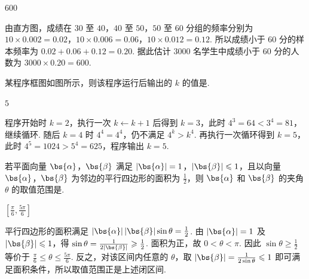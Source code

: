 \begin{answer}
\(600\)
\end{answer}

\begin{solution}
由直方图，成绩在 \(30\) 至 \(40\)，\(40\) 至 \(50\)，\(50\) 至 \(60\) 分组的频率分别为 \(10\times0.002=0.02\)，\(10\times0.006=0.06\)，\(10\times0.012=0.12\). 所以成绩小于 \(60\) 分的样本频率为 \(0.02+0.06+0.12=0.20\). 据此估计 \(3000\) 名学生中成绩小于 \(60\) 分的人数为 \(3000\times0.20=600\).
\end{solution}

\begin{problem}
某程序框图如图所示，则该程序运行后输出的 \(k\) 的值是\fillinblank{}.
\end{problem}

\begin{answer}
\(5\)
\end{answer}

\begin{solution}
程序开始时 \(k=2\)，执行一次 \(k\leftarrow k+1\) 后得到 \(k=3\)，此时 \(4^3=64<3^4=81\)，继续循环. 随后 \(k=4\) 时 \(4^4=4^4\)，仍不满足 \(4^k>k^4\). 再执行一次循环得到 \(k=5\)，此时 \(4^5=1024>5^4=625\)，程序输出 \(k=5\).
\end{solution}

\begin{problem}
若平面向量 \(\bs{\alpha}\)，\(\bs{\beta}\) 满足 \(|\bs{\alpha}| = 1\)，\(|\bs{\beta}| \leqslant 1\)，且以向量 \(\bs{\alpha}\)，\(\bs{\beta}\) 为邻边的平行四边形的面积为 \(\frac{1}{2}\)，则 \(\bs{\alpha}\) 和 \(\bs{\beta}\) 的夹角 \(\theta\) 的取值范围是\fillinblank{}.
\end{problem}

\begin{answer}
\(\left[\frac{\pi}{6},\frac{5\pi}{6}\right]\)
\end{answer}

\begin{solution}
平行四边形的面积满足 \(|\bs{\alpha}|\,|\bs{\beta}|\sin\theta=\frac12\). 由 \(|\bs{\alpha}|=1\) 及 \(|\bs{\beta}|\leqslant1\)，得 \(\sin\theta=\frac1{2|\bs{\beta}|}\geqslant\frac12\). 面积为正，故 \(0<\theta<\pi\). 因此 \(\sin\theta\geqslant\frac12\) 等价于 \(\frac\pi6\leqslant\theta\leqslant\frac{5\pi}6\). 反之，对该区间内任意的 \(\theta\)，取 \(|\bs{\beta}|=\frac1{2\sin\theta}\leqslant1\) 即可满足面积条件，所以取值范围正是上述闭区间.
\end{solution}

